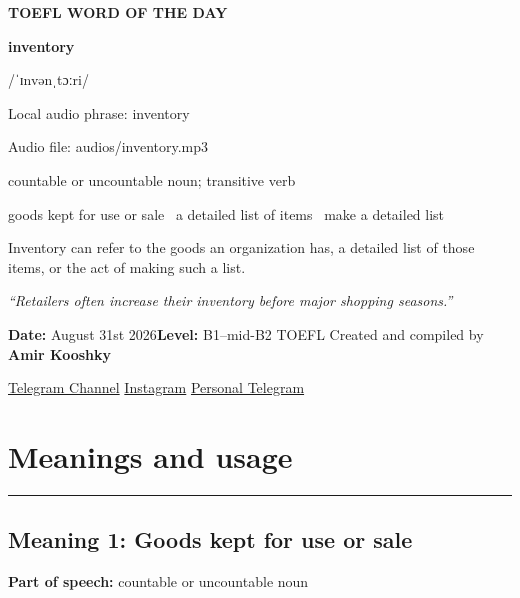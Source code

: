 \documentclass[11pt]{article}
\newcommand{\sectionrule}{\par\vspace{-0.5em}\noindent\textcolor{Accent}{\rule{\linewidth}{0.6pt}}\par}
\begin{document}
\begin{center}
{\sffamily\bfseries\color{Accent} TOEFL WORD OF THE DAY\par}
\vspace{8mm}
{\fontsize{42}{48}\selectfont\bfseries inventory\par}
\vspace{2mm}
{\Large\sffamily\color{Accent} /ˈɪnvənˌtɔːri/\par}
\vspace{2mm}
{\small\sffamily Local audio phrase: inventory\par}
{\small\sffamily Audio file: audios/inventory.mp3\par}
\vspace{2mm}
{\large\sffamily\color{Muted} countable or uncountable noun; transitive verb\par}
\vspace{5mm}
{\sffamily goods kept for use or sale \textbullet\ a detailed list of items \textbullet\ make a detailed list\par}
\vspace{6mm}
{\large Inventory can refer to the goods an organization has, a detailed list of those items, or the act of making such a list.\par}
\vspace{6mm}
\begin{minipage}{0.84\textwidth}
\itshape “Retailers often increase their inventory before major shopping seasons.”
\end{minipage}\par
\vspace{10mm}
\textbf{Date:} August 31st 2026\quad\textbullet\quad \textbf{Level:} B1--mid-B2 TOEFL
\vfill
Created and compiled by \textbf{Amir Kooshky}\par
\vspace{2mm}
\href{https://t.me/KooshkyTOEFL}{Telegram Channel}\quad\textbullet\quad
\href{https://www.instagram.com/kooshkytoefl}{Instagram}\quad\textbullet\quad
\href{https://t.me/KooshkyTOEFL\_pv}{Personal Telegram}
\end{center}
\newpage
\tableofcontents
\newpage

\section{Meanings and usage}
\sectionrule
\subsection{Meaning 1: Goods kept for use or sale}
\textbf{Part of speech:} countable or uncountable noun
\end{document}
